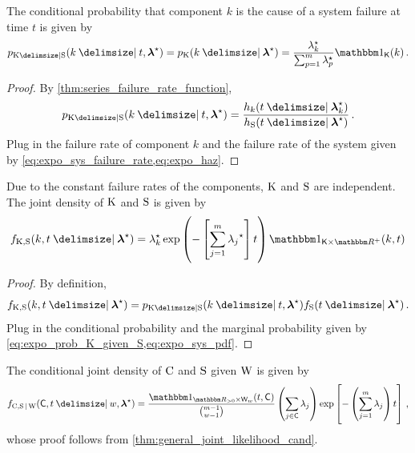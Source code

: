\documentclass[
    11pt,
    extrafontsizes,
    article,
    oldfontcommands,
    final,
    oneside,
    openany,
    hidelinks]{memoir}
\begin{document}
The conditional probability that component $k$ is the cause of a system failure at time $t$ is given by
\begin{equation}
\label{eq:expo_prob_K_given_S}
    \pmf_{\RV{K} \Given \sv}(k \Given t, \tparam{\vec\lambda}) = \pmf_{\RV{K}}(k \Given \tparam{\vec\lambda}) =
        \frac{\tparam{\lambda}_k}{\sum_{p=1}^{m} 
        \tparam{\lambda}_p}\SetIndicator{\Set{K}}(k)\,.
\end{equation}
\begin{proof}
By \cref{thm:series_failure_rate_function},
\begin{equation}
\pmf_{\RV{K} \Given \sv}(k \Given t, \tparam{\vec\lambda}) = \frac
    {\haz_k(t \Given \tparam{\vec\lambda}_k)}
    {\haz_{\sv}(t \Given \tparam{\vec\lambda})}\,.
\end{equation}
Plug in the failure rate of component $k$ and the failure rate of the system given by \cref{eq:expo_sys_failure_rate,eq:expo_haz}.
\end{proof}
Due to the constant failure rates of the components, $\mathrm{K}$ and $\mathrm{S}$ are independent. The joint density of $\mathrm{K}$ and $\mathrm{S}$ is given by
\begin{equation}
\label{eq:expo_joint_k_s}
\pdf_{\RV{K}, \sv}(k, t \Given \tparam{\vec\lambda}) =
    \tparam{\lambda}_k \exp \left(-\left [ \sum_{j=1}^{m}{\tparam{\lambda_j}} \right ] t\right)
    \SetIndicator{\Set{K} \times \RealSet^{+}}(k,t)
\end{equation}
\begin{proof}
By definition,
\begin{equation}
\pdf_{\RV{K}, \sv}(k, t \Given \tparam{\vec\lambda}) =
    \pmf_{\RV{K} \Given \sv}(k \Given t, \tparam{\vec\lambda}) \spdf(t \Given \tparam{\vec\lambda})\,.
\end{equation}
Plug in the conditional probability and the marginal probability given by \cref{eq:expo_prob_K_given_S,eq:expo_sys_pdf}.
\end{proof}

The conditional joint density of $\mathrm{C}$ and $\mathrm{S}$ given $\mathrm{W}$ is given by
\begin{equation}
    \jointpdf(\cand, t \Given w, \tparam{\vec\lambda}) = \frac{\SetIndicator{\RealSet_{>0} \times \candsw{w}}(t,\cand)}{\binom{m-1}{w-1}} \left ( \sum_{j \in \cand} \lambda_j \right ) \exp \left [ - \left ( \sum_{j=1}^{m} \lambda_j \right ) t \right ]\,,
\end{equation}
whose proof follows from \cref{thm:general_joint_likelihood_cand}.
\end{document}
